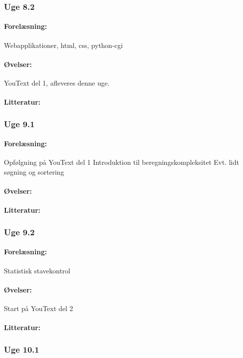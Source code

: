 \documentclass[12pt]{article}
\begin{document}
\subsubsection{Uge 8.2}
\paragraph{Forelæsning:} 
Webapplikationer, html, css, python-cgi
\paragraph{Øvelser:}
YouText del 1, afleveres denne uge.
\paragraph{Litteratur:}

\subsubsection{Uge 9.1}
\paragraph{Forelæsning:}
Opfølgning på YouText del 1
Introduktion til beregningskompleksitet
Evt. lidt søgning og sortering
\paragraph{Øvelser:}
\paragraph{Litteratur:}

\subsubsection{Uge 9.2}
\paragraph{Forelæsning:} 
Statistisk stavekontrol
\paragraph{Øvelser:}
Start på YouText del 2
\paragraph{Litteratur:}

\subsubsection{Uge 10.1}
\end{document}
